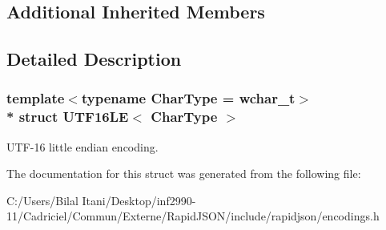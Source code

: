 \subsection*{Additional Inherited Members}


\subsection{Detailed Description}
\subsubsection*{template$<$typename Char\+Type = wchar\+\_\+t$>$\\*
struct U\+T\+F16\+L\+E$<$ Char\+Type $>$}

U\+T\+F-\/16 little endian encoding. 

The documentation for this struct was generated from the following file\+:\begin{DoxyCompactItemize}
\item 
C\+:/\+Users/\+Bilal Itani/\+Desktop/inf2990-\/11/\+Cadriciel/\+Commun/\+Externe/\+Rapid\+J\+S\+O\+N/include/rapidjson/encodings.\+h\end{DoxyCompactItemize}
